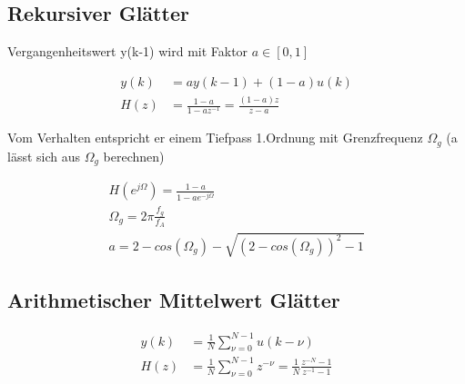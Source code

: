 \documentclass[10pt,a4paper]{article}
\begin{document}
\subsection{Rekursiver Glätter}
Vergangenheitswert y(k-1) wird mit Faktor $a\in [0,1]$
  \begin{mdframed}[style=exercise]
    \begin{align}
        y(k) &= ay(k-1)+(1-a)u(k) \\
        H(z) &=\frac{1-a}{1-az^{-1}}=\frac{(1-a)z}{z-a}
    \end{align}
  \end{mdframed}
Vom Verhalten entspricht er einem Tiefpass 1.Ordnung mit Grenzfrequenz $\Omega_g$ (a lässt sich aus $\Omega_g$ berechnen)
  \begin{mdframed}[style=exercise]
    \begin{align}
        H(e^{j\Omega}) =\frac{1-a}{1-ae^{-j\Omega}}\\
        \Omega_g = 2\pi\frac{f_g}{f_A}\\
        a = 2-cos(\Omega_g)-\sqrt{(2-cos(\Omega_g))^2-1}
    \end{align}
  \end{mdframed}
\subsection{Arithmetischer Mittelwert Glätter}
  \begin{mdframed}[style=exercise]
    \begin{align}
        y(k)&=\frac{1}{N}\sum_{\nu=0}^{N-1} u(k-\nu)\\
        H(z)&=\frac{1}{N}\sum_{\nu=0}^{N-1} z^{-\nu} = \frac{1}{N}\frac{z^{-N}-1}{z^{-1}-1}
    \end{align}
  \end{mdframed}
\end{document}
